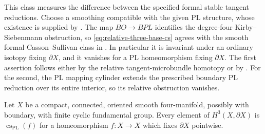 This class measures the difference between the specified formal
stable tangent reductions.
Choose a smoothing compatible with the given PL structure,
whose existence is supplied by
\cite[Essay~I, p.~39]{KirbySiebenmann1977}.
The map $BO\to BPL$ identifies the degree-four
Kirby--Siebenmann obstruction, so \eqref{eq:relative-three-base-cs}
agrees with the smooth formal Casson--Sullivan class in
\cite[Remark~2.5 and Definition~2.11, pp.~2502--2504]{Galvin2026CassonSullivan}.
In particular it is invariant under an ordinary isotopy fixing
$\partial X$, and it vanishes for a PL homeomorphism fixing
$\partial X$.  The first assertion follows either by the
relative tangent-microbundle homotopy or by
\cite[Proposition~2.22, pp.~2507--2508]{Galvin2026CassonSullivan}.
For the second, the PL mapping cylinder extends the prescribed
boundary PL reduction over its entire interior, so its relative
obstruction vanishes.

\begin{lemma}\label{lem:compact-cyclic-relative-cs-realization}
Let $X$ be a compact, connected, oriented smooth four-manifold,
possibly with boundary, with finite cyclic fundamental group.
Every element of $H^3(X,\partial X)$ is
$\operatorname{cs}_{\mathrm{PL}}(f)$ for a homeomorphism
$f:X\to X$ which fixes $\partial X$ pointwise.
\end{lemma}


